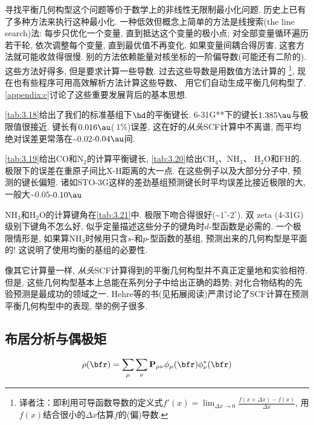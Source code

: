 寻找平衡几何构型这个问题等价于数学上的非线性无限制最小化问题.
历史上已有了多种方法来执行这种最小化.
一种低效但概念上简单的方法是线搜索(the line search)法:
每步只优化一个变量,
直到抵达这个变量的极小点;
对全部变量循环遍历若干轮,
依次调整每个变量, 直到最优值不再变化.
如果变量间耦合得厉害, 这套方法就可能收敛得很慢.
别的方法依赖能量对核坐标的一阶偏导数(可能还有二阶的).
这些方法好得多, 但是要求计算一些导数.
过去这些导数是用数值方法计算的
\footnote{译者注：即利用可导函数导数的定义式$f'(x) = \lim_{\Delta x \to 0} \frac{f(x + \Delta x) - f(x)}{\Delta x}$, 用$f(x)$结合很小的$\Delta x$估算$f$的(偏)导数.},
现在也有些程序可用高效解析方法计算这些导数、
用它们自动生成平衡几何构型了.
\autoref{appendix:c}讨论了这些重要发展背后的基本思想.

\autoref{tab:3.18}给出了我们的标准基组下$\hd$的平衡键长.
6-31G**下的键长$1.385\au$与\hft 极限值很接近.
键长有$0.016\au$($~1\%$)误差,
这在好的\emph{从头}SCF计算中不离谱,
而平均绝对误差更常落在\textasciitilde$0.02$-$0.04\au$间.

\autoref{tab:3.19}给出$\mathrm{CO}$和$\mathrm{N}_2$的计算平衡键长,
\autoref{tab:3.20}给出$\mathrm{CH_4}$、$\mathrm{NH_3}$、
$\mathrm{H_2O}$和$\mathrm{FH}$的.
\hft 极限下的误差在重原子间比X-H距离的大一点.
在这些例子以及大部分分子中,
\hft 预测的键长偏短.
诸如STO-3G这样的差劲基组预测键长时平均误差比接近\hft 极限的大,
一般大\textasciitilde$0.05$-$0.10\au$

$\mathrm{NH_3}$和$\mathrm{H_2O}$的计算键角在\autoref{tab:3.21}中.
\hft 极限下吻合得很好(\textasciitilde$1^{\circ}$-$2^{\circ}$).
双 zeta (4-31G)级别下键角不怎么好,
似乎定量描述这些分子的键角时$d$-型函数是必需的.
一个极限情形是, 如果算$\mathrm{NH_3}$时候用只含$s$-和$p$-型函数的基组,
预测出来的几何构型是平面的!
这说明了使用均衡的基组的必要性.

像其它计算量一样,
\emph{从头}SCF计算得到的平衡几何构型并不真正定量地和实验相符.
但是, 这些几何构型基本上总能在系列分子中给出正确的趋势;
对化合物结构的先验预测是\hft 最成功的领域之一.
Hehre等的书(见拓展阅读)严肃讨论了SCF计算在预测平衡几何构型中的表现,
举的例子很多.

\subsection{布居分析与偶极矩}
\begin{align}
	\rho(\bfr)=\sum_\mu\sum_\nu \mathbf{P}_{\mu\nu}\phi_\mu(\bfr)\phi^*_\nu(\bfr)
\end{align}
